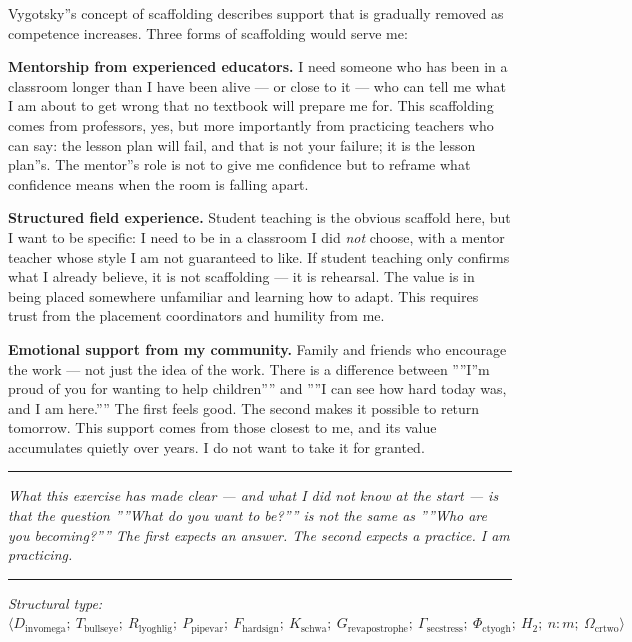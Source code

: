 \documentclass[12pt,a4paper]{article}
\begin{document}
Vygotsky''s concept of scaffolding describes support that is gradually removed as competence increases. Three forms of scaffolding would serve me:

\textbf{Mentorship from experienced educators.} I need someone who has been in a classroom longer than I have been alive --- or close to it --- who can tell me what I am about to get wrong that no textbook will prepare me for. This scaffolding comes from professors, yes, but more importantly from practicing teachers who can say: the lesson plan will fail, and that is not your failure; it is the lesson plan''s. The mentor''s role is not to give me confidence but to reframe what confidence means when the room is falling apart.

\textbf{Structured field experience.} Student teaching is the obvious scaffold here, but I want to be specific: I need to be in a classroom I did \emph{not} choose, with a mentor teacher whose style I am not guaranteed to like. If student teaching only confirms what I already believe, it is not scaffolding --- it is rehearsal. The value is in being placed somewhere unfamiliar and learning how to adapt. This requires trust from the placement coordinators and humility from me.

\textbf{Emotional support from my community.} Family and friends who encourage the work --- not just the idea of the work. There is a difference between ''''I''m proud of you for wanting to help children'''' and ''''I can see how hard today was, and I am here.'''' The first feels good. The second makes it possible to return tomorrow. This support comes from those closest to me, and its value accumulates quietly over years. I do not want to take it for granted.

\begin{center}
\rule{0.5\textwidth}{0.4pt}
\end{center}

\emph{What this exercise has made clear --- and what I did not know at the start --- is that the question ''''What do you want to be?'''' is not the same as ''''Who are you becoming?'''' The first expects an answer. The second expects a practice. I am practicing.}

\begin{center}
\rule{0.5\textwidth}{0.4pt}
\end{center}

\emph{Structural type: $\langle D_{\text{invomega}};\ T_{\text{bullseye}};\ R_{\text{lyoghlig}};\ P_{\text{pipevar}};\ F_{\text{hardsign}};\ K_{\text{schwa}};\ G_{\text{revapostrophe}};\ \Gamma_{\text{secstress}};\ \Phi_{\text{ctyogh}};\ H_2;\ n{:}m;\ \Omega_{\text{crtwo}} \rangle$}
\end{document}
